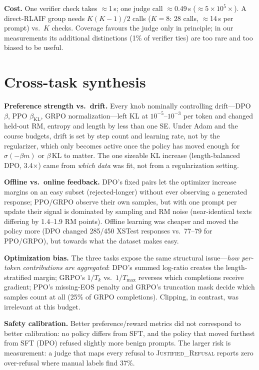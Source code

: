 \documentclass{article}
\begin{document}
\textbf{Cost.} One verifier check takes $\approx$1\,\textmu s; one judge call $\approx$0.49\,s ($\approx5{\times}10^{5}\times$). A direct-RLAIF group needs $K(K{-}1)/2$ calls ($K{=}8$: 28 calls, $\approx$14\,s per prompt) vs.\ $K$ checks. Coverage favours the judge only in principle; in our measurements its additional distinctions (1\% of verifier ties) are too rare and too biased to be useful.

\section{Cross-task synthesis}
\label{sec:synth}
\textbf{Preference strength vs.\ drift.} Every knob nominally controlling drift---DPO $\beta$, PPO $\beta_{\text{KL}}$, GRPO normalization---left KL at $10^{-5}$--$10^{-3}$ per token and changed held-out RM, entropy and length by less than one SE. Under Adam and the course budgets, drift is set by step count and learning rate, not by the regularizer, which only becomes active once the policy has moved enough for $\sigma(-\beta m)$ or $\beta\,\text{KL}$ to matter. The one sizeable KL increase (length-balanced DPO, 3.4$\times$) came from \emph{which data} was fit, not from a regularization setting.

\textbf{Offline vs.\ online feedback.} DPO's fixed pairs let the optimizer increase margins on an easy subset (rejected-longer) without ever observing a generated response; PPO/GRPO observe their own samples, but with one prompt per update their signal is dominated by sampling and RM noise (near-identical texts differing by 1.4--1.9 RM points). Offline learning was cheaper and moved the policy more (DPO changed 285/450 XSTest responses vs.\ 77--79 for PPO/GRPO), but towards what the dataset makes easy.

\textbf{Optimization bias.} The three tasks expose the same structural issue---\emph{how per-token contributions are aggregated}: DPO's summed log-ratio creates the length-stratified margin; GRPO's $1/T_k$ vs.\ $1/T_{\max}$ reverses which completions receive gradient; PPO's missing-EOS penalty and GRPO's truncation mask decide which samples count at all (25\% of GRPO completions). Clipping, in contrast, was irrelevant at this budget.

\textbf{Safety calibration.} Better preference/reward metrics did not correspond to better calibration: no policy differs from SFT, and the policy that moved furthest from SFT (DPO) refused slightly more benign prompts. The larger risk is measurement: a judge that maps every refusal to \textsc{Justified\_Refusal} reports zero over-refusal where manual labels find 37\%.
\end{document}
